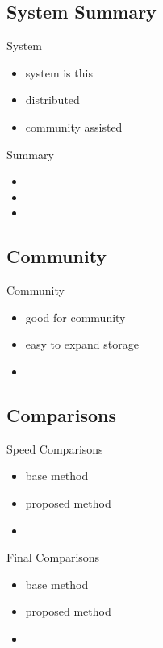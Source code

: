 \documentclass{beamer}
\begin{document}
\subsection{System Summary}
\begin{frame}{System}
  \begin{itemize}   
    \item system is this
    \item distributed
    \item community assisted
  \end{itemize}
\end{frame}

\begin{frame}{Summary}
  \begin{itemize}   
    \item 
    \item 
    \item 
  \end{itemize}
\end{frame}

\subsection{Community}
\begin{frame}{Community}
  \begin{itemize}   
    \item good for community
    \item easy to expand storage
    \item 
  \end{itemize}
\end{frame}

\subsection{Comparisons}
\begin{frame}{Speed Comparisons}
  \begin{itemize}   
    \item base method
    \item proposed method
    \item 
  \end{itemize}
\end{frame}


\begin{frame}{Final Comparisons}
  \begin{itemize}   
    \item base method
    \item proposed method
    \item 
  \end{itemize}
\end{frame}
\end{document}
